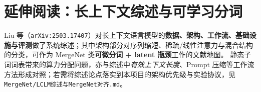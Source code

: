 \documentclass[11pt, a4paper]{article}
\begin{document}
\section{延伸阅读：长上下文综述与可学习分词}

Liu 等（\texttt{arXiv:2503.17407}）对长上下文语言模型的\textbf{数据、架构、工作流、基础设施与评测}做了系统综述；其中架构部分对序列缩短、稀疏/线性注意力与混合结构的分类，可作为 MergeNet 类\textbf{可微分词 + latent 瓶颈}工作的文献地图。
静态子词词表带来的算力分配问题，亦与综述中\textit{有效上下文长度}、Prompt 压缩等工作流方法形成对照；若需将综述论点落实到本项目的架构优先级与实验协议，见 \texttt{MergeNet/LCLM综述与MergeNet对齐.md}。
\end{document}
